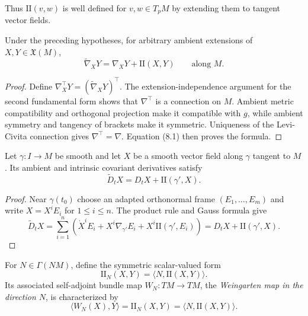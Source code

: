 Thus $\mathrm{II}(v,w)$ is well defined for $v,w\in T_pM$ by extending them
to tangent vector fields.

\begin{theorem}
\label{thm:gauss-formula}


Under the preceding hypotheses, for arbitrary ambient extensions of
$X,Y\in\mathfrak X(M)$,
\[
\widetilde\nabla_XY=\nabla_XY+\mathrm{II}(X,Y)
\qquad\text{along }M.
\]
\end{theorem}

\begin{proof}
\sketch Define
$\nabla_X^\top Y=(\widetilde\nabla_XY)^\top$. The extension-independence
argument for the second fundamental form shows that $\nabla^\top$ is a
connection on $M$. Ambient metric compatibility and orthogonal projection
make it compatible with $g$, while ambient symmetry and tangency of brackets
make it symmetric. Uniqueness of the Levi-Civita connection gives
$\nabla^\top=\nabla$. Equation (8.1) then proves the formula.
\end{proof}

\begin{corollary}
\label{cor:gauss-formula-along-curve}


Let $\gamma:I\to M$ be smooth and let $X$ be a smooth vector field along
$\gamma$ tangent to $M$. Its ambient and intrinsic covariant derivatives
satisfy
\begin{equation}
\widetilde D_tX=D_tX+\mathrm{II}(\gamma',X).
\tag{8.2}
\end{equation}
\end{corollary}

\begin{proof}
\sketch Near $\gamma(t_0)$ choose an adapted orthonormal frame
$(E_1,\ldots,E_m)$ and write $X=X^iE_i$ for $1\leq i\leq n$. The product rule
and Gauss formula give
\[
\widetilde D_tX
=\sum_{i=1}^n\left(\dot X^iE_i+X^i\nabla_{\gamma'}E_i
+X^i\mathrm{II}(\gamma',E_i)\right)
=D_tX+\mathrm{II}(\gamma',X).
\]
\end{proof}

For $N\in\Gamma(NM)$, define the symmetric scalar-valued form
\begin{equation}
\mathrm{II}_N(X,Y)=\langle N,\mathrm{II}(X,Y)\rangle.
\tag{8.3}
\end{equation}
Its associated self-adjoint bundle map $W_N:TM\to TM$, the
\emph{Weingarten map in the direction $N$}, is characterized by
\begin{equation}
\langle W_N(X),Y\rangle
=\mathrm{II}_N(X,Y)
=\langle N,\mathrm{II}(X,Y)\rangle.
\tag{8.4}
\end{equation}


